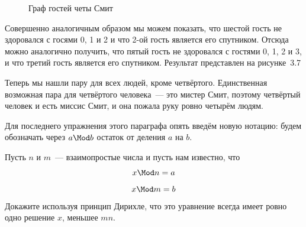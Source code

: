 \begin{example}
\begin{figure}[h]
\caption{Граф гостей четы Смит}
\end{figure}

Совершенно аналогичным образом мы можем показать, что шестой гость не здоровался с госями 0, 1 и 2 и что 2-ой гость является его спутником. Отсюда можно аналогично получить, что пятый гость не здоровался с гостями 0, 1, 2 и 3, и что третий гость является его спутником. Результат представлен на рисунке~3.7

Теперь мы нашли пару для всех людей, кроме четвёртого. Единственная возможная пара для четвёртого человека~— это мистер Смит, поэтому четвёртый человек и есть миссис Смит, и она пожала руку ровно четырём людям.
\end{example}

Для последнего упражнения этого параграфа опять введём новую нотацию: будем обозначать через $a\Mod b$ остаток от деления $a$ на $b$.

\begin{exercise}
Пусть $n$ и $m$~— взаимопростые числа и пусть нам известно, что
$$x\Mod n = a$$
$$x\Mod m = b$$
Докажите используя принцип Дирихле, что это уравнение всегда имеет ровно одно решение $x$, меньшее $mn$.
\end{exercise}
